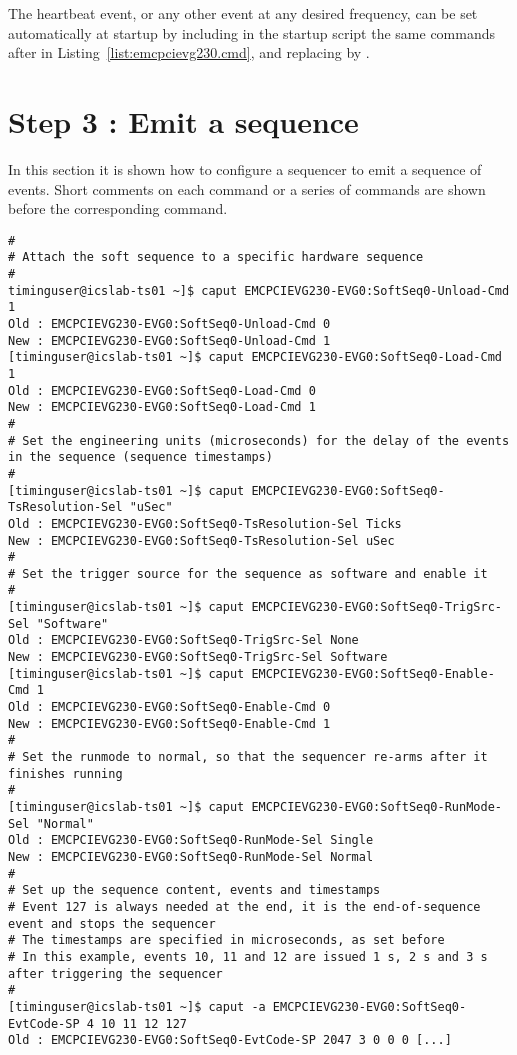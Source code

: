 \documentclass[11pt
  , a4paper
  , article
  , oneside
  , showtrims
]{memoir}
\begin{document}
The heartbeat event, or any other event at any desired frequency, can be set automatically at startup by including in the startup script the same commands after  in Listing~\ref{list:emcpcievg230.cmd}, and replacing  by .


\section{Step 3 : Emit a sequence}
In this section it is shown how to configure a sequencer to emit a sequence of events. Short comments on each command or a series of commands are shown before the corresponding command.
\begin{lstlisting}[style=termstyle]
#
# Attach the soft sequence to a specific hardware sequence
#
timinguser@icslab-ts01 ~]$ caput EMCPCIEVG230-EVG0:SoftSeq0-Unload-Cmd 1
Old : EMCPCIEVG230-EVG0:SoftSeq0-Unload-Cmd 0
New : EMCPCIEVG230-EVG0:SoftSeq0-Unload-Cmd 1
[timinguser@icslab-ts01 ~]$ caput EMCPCIEVG230-EVG0:SoftSeq0-Load-Cmd 1
Old : EMCPCIEVG230-EVG0:SoftSeq0-Load-Cmd 0
New : EMCPCIEVG230-EVG0:SoftSeq0-Load-Cmd 1
#
# Set the engineering units (microseconds) for the delay of the events in the sequence (sequence timestamps)
#
[timinguser@icslab-ts01 ~]$ caput EMCPCIEVG230-EVG0:SoftSeq0-TsResolution-Sel "uSec"
Old : EMCPCIEVG230-EVG0:SoftSeq0-TsResolution-Sel Ticks
New : EMCPCIEVG230-EVG0:SoftSeq0-TsResolution-Sel uSec
#
# Set the trigger source for the sequence as software and enable it
#
[timinguser@icslab-ts01 ~]$ caput EMCPCIEVG230-EVG0:SoftSeq0-TrigSrc-Sel "Software"
Old : EMCPCIEVG230-EVG0:SoftSeq0-TrigSrc-Sel None
New : EMCPCIEVG230-EVG0:SoftSeq0-TrigSrc-Sel Software
[timinguser@icslab-ts01 ~]$ caput EMCPCIEVG230-EVG0:SoftSeq0-Enable-Cmd 1
Old : EMCPCIEVG230-EVG0:SoftSeq0-Enable-Cmd 0
New : EMCPCIEVG230-EVG0:SoftSeq0-Enable-Cmd 1
#
# Set the runmode to normal, so that the sequencer re-arms after it finishes running
#
[timinguser@icslab-ts01 ~]$ caput EMCPCIEVG230-EVG0:SoftSeq0-RunMode-Sel "Normal"
Old : EMCPCIEVG230-EVG0:SoftSeq0-RunMode-Sel Single
New : EMCPCIEVG230-EVG0:SoftSeq0-RunMode-Sel Normal
#
# Set up the sequence content, events and timestamps
# Event 127 is always needed at the end, it is the end-of-sequence event and stops the sequencer
# The timestamps are specified in microseconds, as set before
# In this example, events 10, 11 and 12 are issued 1 s, 2 s and 3 s after triggering the sequencer
#
[timinguser@icslab-ts01 ~]$ caput -a EMCPCIEVG230-EVG0:SoftSeq0-EvtCode-SP 4 10 11 12 127
Old : EMCPCIEVG230-EVG0:SoftSeq0-EvtCode-SP 2047 3 0 0 0 [...]

\end{lstlisting}
\end{document}
